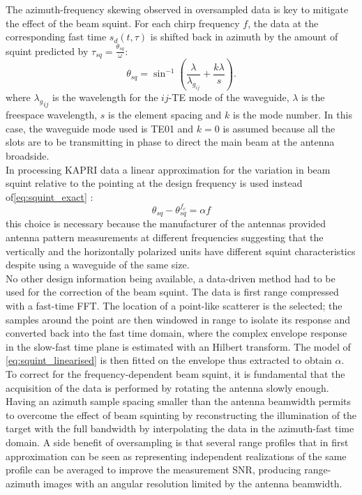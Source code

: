 The azimuth-frequency skewing observed in oversampled data is key to mitigate the effect of the beam squint. For each chirp frequency $f$, the data at the corresponding fast time $s_{d}\left(t,\tau\right)$ is shifted back in azimuth by the amount of squint predicted by $\tau_{sq}=\frac{\theta_{sq}}{\omega}$:
\begin{equation}\label{eq:squint_exact}
	\theta_{sq} = \sin^{-1}\left(\frac{\lambda}{\lambda_{g_{ij}}} + \frac{k \lambda}{s}\right).
\end{equation}
where ${\lambda_g}_{ij}$ is the wavelength for the $ij$-TE mode of the waveguide, $\lambda$ is the freespace wavelength, $s$ is the element spacing and $k$ is the mode number. In this case, the waveguide mode used is TE01 and $k=0$ is assumed because all the slots are to be transmitting in phase\cite{kraus88} to direct the main beam at the antenna broadside.\\
In processing KAPRI data a linear approximation for  the variation in beam squint relative to the pointing at the design frequency is used instead of\autoref{eq:squint_exact} :
\begin{equation}\label{eq:squint_linearised}
	\theta_{sq} - \theta_{sq}^{f_{c}}  =  \alpha f
\end{equation}
this choice is necessary because the manufacturer of the antennas provided antenna pattern measurements at different frequencies suggesting that the vertically and the horizontally polarized units have different squint characteristics despite using a waveguide of the same size.\\ No other design information being available, a data-driven method had to be used for the correction of the beam squint.  The data is first range compressed with a fast-time FFT. The location of a point-like scatterer is the selected; the samples around the point are then windowed in range to isolate its response and converted back into the fast time domain, where the complex envelope response in the slow-fast time plane is estimated with an Hilbert transform. The model of \autoref{eq:squint_linearised} is then fitted on the envelope thus extracted to obtain $\alpha$.
To correct for the frequency-dependent beam squint, it is fundamental that the acquisition of the data is performed by rotating the antenna slowly enough. Having an azimuth sample spacing smaller than the antenna beamwidth permits to overcome the effect of beam squinting by reconstructing the illumination of the target with the full bandwidth by interpolating the data in the azimuth-fast time domain. A side benefit of oversampling is that several range profiles that in first approximation can be seen as representing independent realizations of the same profile can be averaged to improve the measurement SNR, producing range-azimuth images with an angular resolution limited by the antenna beamwidth.\\

